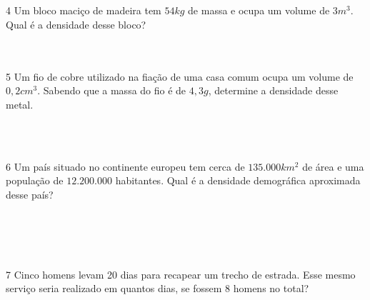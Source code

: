 \\
\\
\\
\\

\num{4} Um bloco maciço de madeira tem $54 kg$ de massa e ocupa um volume de $3
m^3$. Qual é a densidade desse bloco?

\\
\\

\num{5} Um fio de cobre utilizado na fiação de uma casa comum ocupa um volume
de $0,2 cm^3$. Sabendo que a massa do fio é de $4,3 g$, determine a densidade
desse metal.

\\
\\

\pagebreak

\num{6} Um país situado no continente europeu tem cerca de $135.000 km^2$ de
área e uma população de $12.200.000$ habitantes. Qual é a densidade
demográfica aproximada desse país?

\\
\\
\\
\\

\num{7} Cinco homens levam 20 dias para recapear um trecho de estrada. Esse
mesmo serviço seria realizado em quantos dias, se fossem 8 homens no
total?

\\
\\
\\
\\
\\


